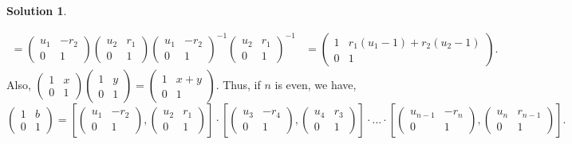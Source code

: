 \documentclass[10pt]{article}
\theoremstyle{Theorem}
\theoremstyle{definition}
\newtheorem{sol}{Solution}
\theoremstyle{remark}
\theoremstyle{custom}
\begin{document}
\begin{sol}
\begin{description}
\begin{align*}
 [(\begin{smallmatrix}u_1&-r_2\\0&1\end{smallmatrix}),(\begin{smallmatrix}u_2&r_1\\0&1\end{smallmatrix})]=(\begin{smallmatrix}u_1&-r_2\\0&1\end{smallmatrix})(\begin{smallmatrix}u_2&r_1\\0&1\end{smallmatrix})(\begin{smallmatrix}u_1&-r_2\\0&1\end{smallmatrix})^{-1}(\begin{smallmatrix}u_2&r_1\\0&1\end{smallmatrix})^{-1} 
&=  (\begin{smallmatrix}1&r_1(u_1-1)+r_2(u_2-1)\\0&1\end{smallmatrix}).
\end{align*}
Also, $(\begin{smallmatrix}1&x\\0&1\end{smallmatrix})(\begin{smallmatrix}1&y\\0&1\end{smallmatrix})=(\begin{smallmatrix}1&x+y\\0&1\end{smallmatrix})$. 
Thus, if $n$ is even, we have, 
\[(\begin{smallmatrix}1&b\\0&1\end{smallmatrix})= [(\begin{smallmatrix}u_1&-r_2\\0&1\end{smallmatrix}),(\begin{smallmatrix}u_2&r_1\\0&1\end{smallmatrix})]\cdot
[(\begin{smallmatrix}u_3&-r_4\\0&1\end{smallmatrix}),(\begin{smallmatrix}u_4&r_3\\0&1\end{smallmatrix})]\cdot ... \cdot [(\begin{smallmatrix}u_{n-1}&-r_n\\0&1\end{smallmatrix}),(\begin{smallmatrix}u_n&r_{n-1}\\0&1\end{smallmatrix})].       \]

\end{description}
\end{sol}
\end{document}
